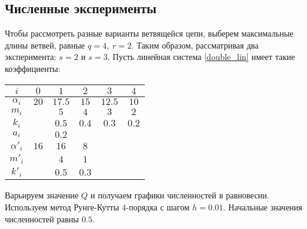 \subsection{Численные эксперименты}
Чтобы рассмотреть разные варианты ветвящейся цепи, выберем максимальные длины ветвей, равные \(q = 4, ~ r=2\). Таким образом, рассматривая два эксперимента: \(s=2\) и \(s=3\). Пусть линейная система \eqref{double_lin} имеет такие коэффициенты:

\begin{center}
    \begin{tabular}{|c|c|c|c|c|c|}
        \hline
        \(i\)        & \(0\) & \(1\) & \(2\) & \(3\) & \(4\) \\ \hline
        \(\alpha_i\)& \(20\) & \(17.5\) & \(15\) & \(12.5\) & \(10\) \\ \hline
        \(m_i\) &            & \(5\) & \(4\) & \(3\) & \(2\) \\ \hline
        \(k_i\) &            & \(0.5\) & \(0.4\) & \(0.3\) & \(0.2\) \\ \hline
        \(a_i\) &            & \(0.2\) &  &  &  \\ \hline \hline

        \(\alpha'_i\)& \(16\) & \(16\) & \(8\) &  &  \\ \hline
        \(m'_i\) &            & \(4\) & \(1\) &  &  \\ \hline
        \(k'_i\) &            & \(0.5\) & \(0.3\) &  &  \\ \hline
    \end{tabular}
\end{center}

Варьируем значение \(Q\) и получаем графики численностей в равновесии. Используем метод Рунге-Кутты \(4\)-порядка с шагом \(h = 0.01\). Начальные значения численностей равны \(0.5\). 

